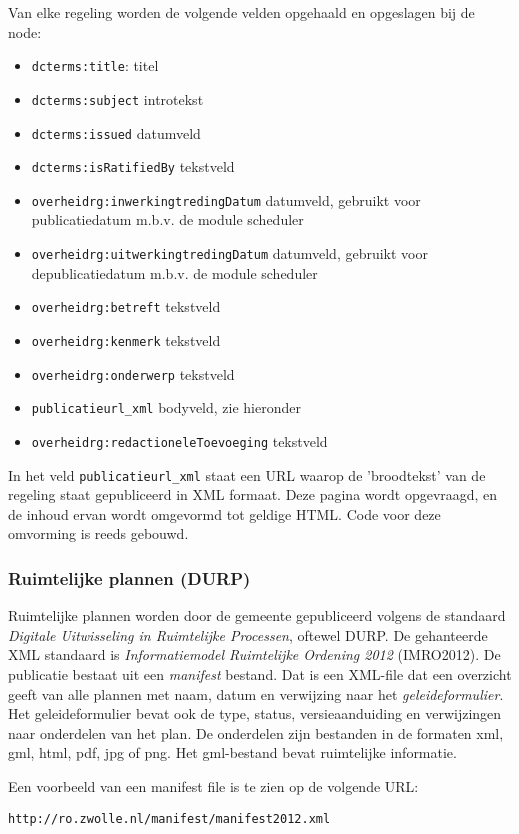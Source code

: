Van elke regeling worden de volgende velden opgehaald en opgeslagen bij de node:

\begin{itemize}
\item \texttt{dcterms:title}: titel
\item \texttt{dcterms:subject} introtekst
\item \texttt{dcterms:issued} datumveld
\item \texttt{dcterms:isRatifiedBy} tekstveld
\item \texttt{overheidrg:inwerkingtredingDatum} datumveld, gebruikt voor publicatiedatum m.b.v. de module scheduler
\item \texttt{overheidrg:uitwerkingtredingDatum} datumveld, gebruikt voor depublicatiedatum m.b.v. de module scheduler
\item \texttt{overheidrg:betreft} tekstveld
\item \texttt{overheidrg:kenmerk} tekstveld
\item \texttt{overheidrg:onderwerp} tekstveld
\item \texttt{publicatieurl\_xml} bodyveld, zie hieronder
\item \texttt{overheidrg:redactioneleToevoeging} tekstveld
\end{itemize}

In het veld \texttt{publicatieurl\_xml} staat een URL waarop de 'broodtekst' van de regeling staat gepubliceerd in XML formaat. Deze pagina wordt opgevraagd, en de inhoud ervan wordt omgevormd tot geldige HTML. Code voor deze omvorming is reeds gebouwd.

\subsubsection{Ruimtelijke plannen (DURP)}

Ruimtelijke plannen worden door de gemeente gepubliceerd volgens de standaard \emph{Digitale Uitwisseling in Ruimtelijke Processen}, oftewel DURP. De gehanteerde XML standaard is \emph{Informatiemodel Ruimtelijke Ordening 2012} (IMRO2012). De publicatie bestaat uit een \emph{manifest} bestand. Dat is een XML-file dat een overzicht geeft van alle plannen met naam, datum en verwijzing naar het \emph{geleideformulier}. Het geleideformulier bevat ook de type, status, versieaanduiding en verwijzingen naar onderdelen van het plan. De onderdelen zijn bestanden in de formaten xml, gml, html, pdf, jpg of png. Het gml-bestand bevat ruimtelijke informatie.

Een voorbeeld van een manifest file is te zien op de volgende URL:
\begin{verbatim}
http://ro.zwolle.nl/manifest/manifest2012.xml
\end{verbatim}

